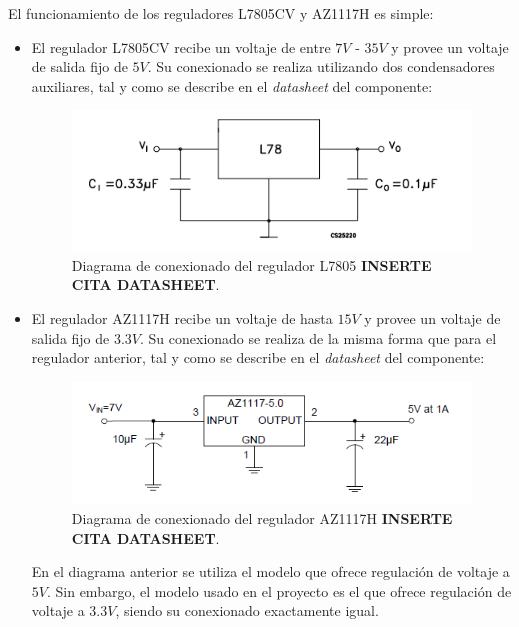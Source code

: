 El funcionamiento de los reguladores L7805CV y AZ1117H es simple:
\begin{itemize}
    \item El regulador L7805CV recibe un voltaje de entre $7V$ - $35V$ y provee un voltaje de salida fijo de $5V$. Su conexionado se realiza utilizando dos condensadores auxiliares, tal y como se describe en el \textit{datasheet} del componente:
    
    \begin{figure}[H]
    \centering 
    \includegraphics[width=.75\linewidth]{pictures/L7805Datasheet.PNG}
    \caption{Diagrama de conexionado del regulador L7805 \textbf{INSERTE CITA DATASHEET}.}
    \label{fig:CAMBIAR!!!!!!!!!!}
    \end{figure}
    
    \item El regulador AZ1117H recibe un voltaje de hasta $15V$ y provee un voltaje de salida fijo de $3.3V$. Su conexionado se realiza de la misma forma que para el regulador anterior, tal y como se describe en el \textit{datasheet} del componente:
    
    \begin{figure}[H]
    \centering 
    \includegraphics[width=.75\linewidth]{pictures/AZ1117Hdatasheet.PNG}
    \caption{Diagrama de conexionado del regulador AZ1117H \textbf{INSERTE CITA DATASHEET}.}
    \label{fig:CAMBIAR!!!!!!!!!!}
    \end{figure}
    
    En el diagrama anterior se utiliza el modelo que ofrece regulación de voltaje a $5V$. Sin embargo, el modelo usado en el proyecto es el que ofrece regulación de voltaje a $3.3V$, siendo su conexionado exactamente igual.
    
\end{itemize}

